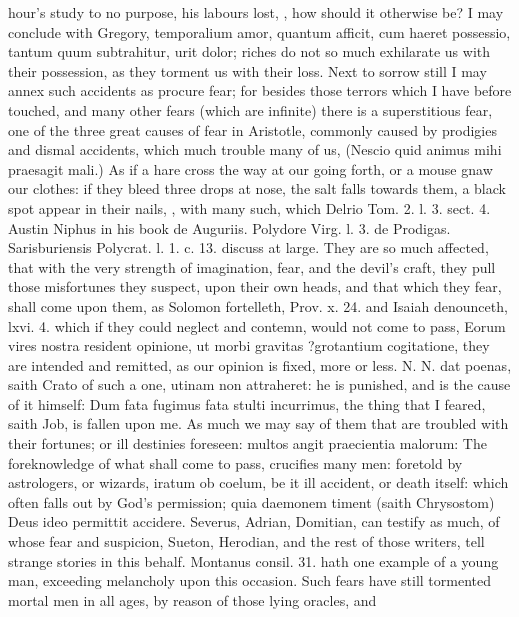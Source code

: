 {hour's study to no purpose, his labours lost, \etc{}, how should it
otherwise be? I may conclude with Gregory, temporalium amor, quantum
afficit, cum haeret possessio, tantum quum subtrahitur, urit dolor;
riches do not so much exhilarate us with their possession, as they
torment us with their loss.
Next to sorrow still I may annex such accidents as procure fear; for
besides those terrors which I have before touched, and many other
fears (which are infinite) there is a superstitious fear, one of the
three great causes of fear in Aristotle, commonly caused by prodigies
and dismal accidents, which much trouble many of us, (Nescio quid
animus mihi praesagit mali.) As if a hare cross the way at our going
forth, or a mouse gnaw our clothes: if they bleed three drops at nose,
the salt falls towards them, a black spot appear in their nails, \etc{},
with many such, which Delrio Tom. 2. l. 3. sect. 4. Austin Niphus in
his book de Auguriis. Polydore Virg. l. 3. de Prodigas. Sarisburiensis
Polycrat. l. 1. c. 13. discuss at large. They are so much affected,
that with the very strength of imagination, fear, and the devil's
craft, they pull those misfortunes they suspect, upon their own
heads, and that which they fear, shall come upon them, as Solomon
fortelleth, Prov. x. 24. and Isaiah denounceth, lxvi. 4. which if
they could neglect and contemn, would not come to pass, Eorum
vires nostra resident opinione, ut morbi gravitas ?grotantium
cogitatione, they are intended and remitted, as our opinion is fixed,
more or less. N. N. dat poenas, saith Crato of such a one, utinam
non attraheret: he is punished, and is the cause of it  himself:
Dum fata fugimus fata stulti incurrimus, the thing that I feared,
saith Job, is fallen upon me.
As much we may say of them that are troubled with their fortunes; or
ill destinies foreseen: multos angit praecientia malorum: The
foreknowledge of what shall come to pass, crucifies many men: foretold
by astrologers, or wizards, iratum ob coelum, be it ill accident, or
death itself: which often falls out by God's permission; quia daemonem
timent (saith Chrysostom) Deus ideo permittit accidere. Severus,
Adrian, Domitian, can testify as much, of whose fear and suspicion,
Sueton, Herodian, and the rest of those writers, tell strange stories
in this behalf. Montanus consil. 31. hath one example of a young
man, exceeding melancholy upon this occasion. Such fears have still
tormented mortal men in all ages, by reason of those lying oracles, and
}
